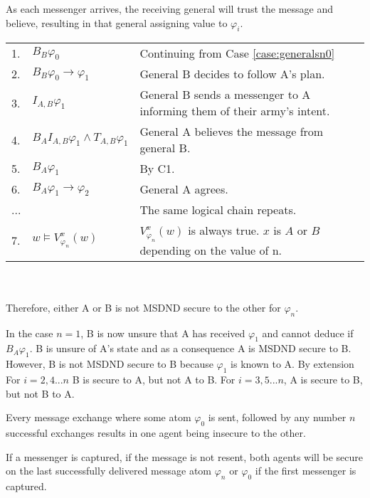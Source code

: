 As each messenger arrives, the receiving general will trust the message and believe, resulting in that general assigning value to $\varphi_i$.

\begin{table}[h!]
\centering
\small
\begin{tabularx}{\linewidth}{l l X}
1. & $B_{B} \varphi_0$ & Continuing from Case \ref{case:generalsn0} \\
2. & $B_{B} \varphi_0 \rightarrow \varphi_1$ & General B decides to follow A's plan. \\
3. & $I_{A,B} \varphi_1$ & General B sends a messenger to A informing them of their army's intent. \\
4. & $B_{A}I_{A,B} \varphi_1 \wedge T_{A,B} \varphi_1$ & General A believes the message from general B. \\
5. & $B_{A}\varphi_1$ & By C1. \\
6. & $B_{A}\varphi_1 \rightarrow \varphi_2$ & General A agrees. \\
...& & The same logical chain repeats. \\
7. & $w \vDash V_{\varphi_n}^{x}(w)$ & $V_{\varphi_n}^{x}(w)$ is always true. $x$ is $A$ or $B$ depending on the value of n. %
\end{tabularx} \\~\\
Therefore, either A or B is not MSDND secure to the other for $\varphi_n$.
\label{tab:twoarmiesproof2}
\end{table}

In the case $n=1$, B is now unsure that A has received $\varphi_1$ and cannot deduce if $B_{A} \varphi_1$. B is unsure of A's state and as a consequence A is MSDND secure to B. However, B is not MSDND secure to B because $\varphi_1$ is known to A. By extension For $i=2,4...n$ B is secure to A, but not A to B. For $i=3,5...n$, A is secure to B, but not B to A.

\begin{cor}
Every message exchange where some atom $\varphi_0$ is sent, followed by any number $n$ successful exchanges results in one agent being insecure to the other.
\end{cor}

\begin{thm}
If a messenger is captured, if the message is not resent, both agents will be secure on the last successfully delivered message atom $\varphi_{n}$ or $\varphi_0$ if the first messenger is captured.
\label{thm:captured}
\end{thm}

